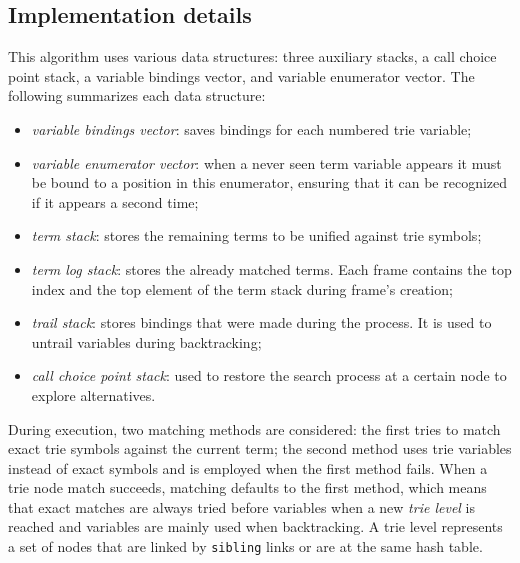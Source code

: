 \subsection{Implementation details}

This algorithm uses various data structures: three auxiliary stacks, a call choice point stack,
a variable bindings vector, and variable enumerator vector. The following summarizes
each data structure: 

\begin{itemize}
  \item \textit{variable bindings vector}: saves bindings for each numbered trie variable;
  \item \textit{variable enumerator vector}: when a never seen term variable appears it must be bound to a position in this enumerator, ensuring that it can be recognized if it appears a second time;
  \item \textit{term stack}: stores the remaining terms to be unified against trie symbols;
  \item \textit{term log stack}: stores the already matched terms. Each frame contains the top index and the top element of the term stack during frame's creation;
  \item \textit{trail stack}: stores bindings that were made during the process. It is used to untrail variables during backtracking;
  \item \textit{call choice point stack}: used to restore the search process at a certain node to explore alternatives.
\end{itemize}

During execution, two matching methods are considered: the first tries to match exact trie symbols against the current term;
the second method uses trie variables instead of exact symbols and is employed when the first method fails.
When a trie node match succeeds, matching defaults to the first method, which means
that exact matches are always tried before variables when a new \textit{trie level} is reached and variables are mainly
used when backtracking. A trie level represents a set of nodes that are linked by \texttt{sibling} links or are at
the same hash table.

